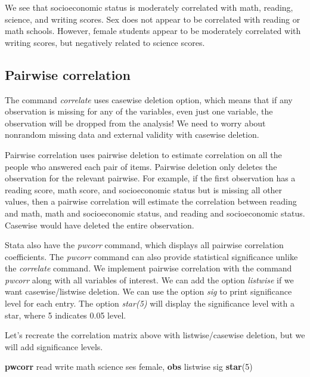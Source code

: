 \documentclass[
]{book}
\newenvironment{Shaded}{\begin{snugshade}}{\end{snugshade}}
\newcommand{\KeywordTok}[1]{\textcolor[rgb]{0.13,0.29,0.53}{\textbf{#1}}}
\newcommand{\NormalTok}[1]{#1}
\begin{document}
We see that socioeconomic status is moderately correlated with math, reading, science, and writing scores. Sex does not appear to be correlated with reading or math schools. However, female students appear to be moderately correlated with writing scores, but negatively related to science scores.

\subsection{Pairwise correlation}\label{pairwise-correlation}

The command \emph{correlate} uses casewise deletion option, which means that if any observation is missing for any of the variables, even just one variable, the observation will be dropped from the analysis! We need to worry about nonrandom missing data and external validity with casewise deletion.

Pairwise correlation uses pairwise deletion to estimate correlation on all the people who answered each pair of items. Pairwise deletion only deletes the observation for the relevant pairwise. For example, if the first observation has a reading score, math score, and socioeconomic status but is missing all other values, then a pairwise correlation will estimate the correlation between reading and math, math and socioeconomic status, and reading and socioeconomic status. Casewise would have deleted the entire observation.

Stata also have the \emph{pwcorr} command, which displays all pairwise correlation coefficients. The \emph{pwcorr} command can also provide statistical significance unlike the \emph{correlate} command. We implement pairwise correlation with the command \emph{pwcorr} along with all variables of interest. We can add the option \emph{listwise} if we want casewise/listwise deletion. We can use the option \emph{sig} to print significance level for each entry. The option \emph{star(5)} will display the significance level with a star, where 5 indicates 0.05 level.

Let's recreate the correlation matrix above with listwise/casewise deletion, but we will add significance levels.

\begin{Shaded}
\begin{Highlighting}[]
\KeywordTok{pwcorr}\NormalTok{ read write math science ses female, }\KeywordTok{obs}\NormalTok{ listwise sig }\KeywordTok{star}\NormalTok{(5)}
\end{Highlighting}
\end{Shaded}
\end{document}
